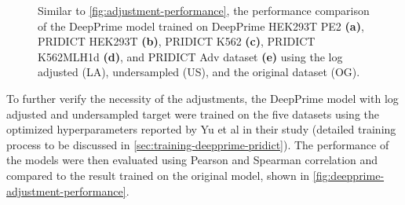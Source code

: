 \begin{figure}
    \centering
    \vspace{-3mm} %
    \vspace{-3mm} %
    \vspace{-3mm} 
    \vspace{-3mm} 
    \vspace{-3mm} 
    \caption[DeepPrime model performance comparison after adjustments]{
        Similar to \autoref{fig:adjustment-performance}, the performance comparison of the DeepPrime model trained on  DeepPrime HEK293T PE2 \textbf{(a)}, PRIDICT HEK293T  \textbf{(b)},  PRIDICT K562  \textbf{(c)},  PRIDICT K562MLH1d  \textbf{(d)}, and  PRIDICT Adv dataset \textbf{(e)} using the log adjusted (LA), undersampled (US), and the original dataset (OG). 
    }
    \label{fig:deepprime-adjustment-performance}
\end{figure}

To further verify the necessity of the adjustments, the DeepPrime model with log adjusted and undersampled target were trained on the five datasets using the optimized hyperparameters reported by Yu et al in their study (detailed training process to be discussed in \autoref{sec:training-deepprime-pridict})\cite{yuPredictionEfficienciesDiverse2023}. The performance of the models were then evaluated using Pearson and Spearman correlation and compared to the result trained on the original model, shown in \autoref{fig:deepprime-adjustment-performance}.

